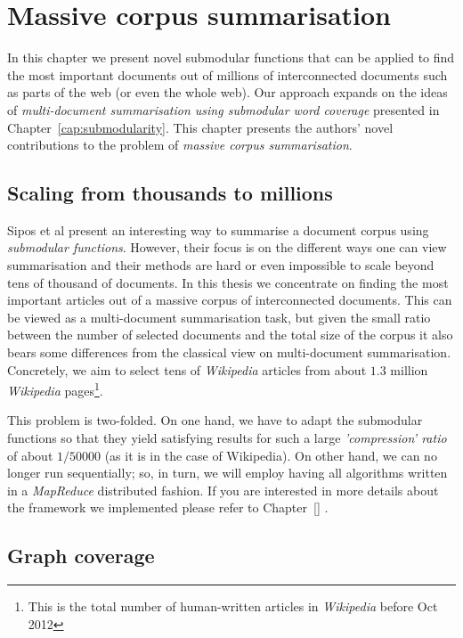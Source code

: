 \chapter{Massive corpus summarisation}

In this chapter we present novel submodular functions that can be applied to
find the most important documents out of millions of interconnected documents
such as parts of the web (or even the whole web).
Our approach expands on the ideas of \emph{multi-document summarisation using
submodular word coverage} \cite{sipos2012temporal} presented in
Chapter~\vref{cap:submodularity}.
This chapter presents the authors' novel contributions to the problem of
\emph{massive corpus summarisation}.

\section{Scaling from thousands to millions}

Sipos et al \cite{sipos2012temporal} present an interesting way to summarise a
document corpus using \emph{submodular functions}. However, their focus is on
the different ways one can view summarisation and their methods are hard or
even impossible to scale beyond tens of thousand of documents.
In this thesis we concentrate on finding the most important articles out of a
massive corpus of interconnected documents. This can be viewed as a
multi-document summarisation task, but given the small ratio between the
number of selected documents and the total size of the corpus it also bears
some differences from the classical view on multi-document summarisation.
Concretely, we aim to select tens of \emph{Wikipedia} articles from about
\(1.3\) million \emph{Wikipedia} pages\footnote{This is the total number of
human-written articles in \emph{Wikipedia} before Oct 2012}.

This problem is two-folded. On one hand, we have to adapt the submodular
functions so that they yield satisfying results for such a large
\emph{'compression' ratio} of about \(1/50000\) (as it is in the case of
Wikipedia). On other hand, we can no longer run sequentially; so, in turn, we
will employ having all algorithms written in a \emph{MapReduce}
\cite{dean2008mapreduce} distributed fashion. If you are interested in more
details about the framework we implemented please refer to Chapter~\vref{}
.

\section{Graph coverage}
\label{sec:graph-coverage}

